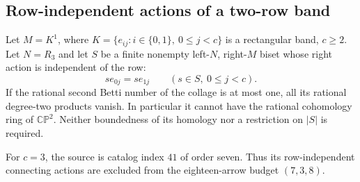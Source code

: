 \subsection{Row-independent actions of a two-row band}

\begin{theorem}
\label{CP2:A-two-row-band-row-independent-right-zero}
Let $M=K^1$, where
$K=\{e_{ij}:i\in\{0,1\},\ 0\le j<c\}$ is a rectangular
band, $c\ge2$.  Let $N=R_3$ and let $S$ be a finite
nonempty left-$N$, right-$M$ biset whose right action
is independent of the row:
\[
 se_{0j}=se_{1j}\qquad(s\in S,\ 0\le j<c).
\]
If the rational second Betti number of the collage is
at most one, all its rational degree-two products vanish.
In particular it cannot have the rational cohomology
ring of $\mathbb{CP}^2$.  Neither boundedness of its
homology nor a restriction on $|S|$ is required.

For $c=3$, the source is catalog index $41$ of order seven.
Thus its row-independent connecting actions are excluded
from the eighteen-arrow budget $(7,3,8)$.
\end{theorem}
